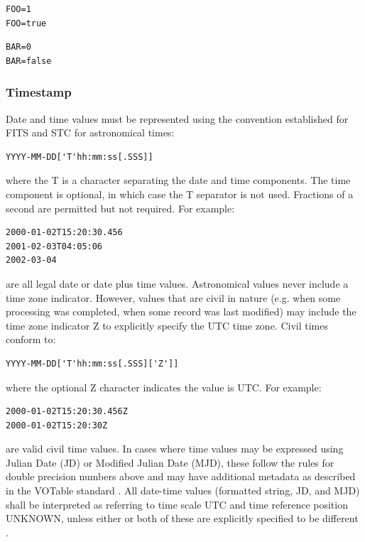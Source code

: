 \documentclass[11pt,letter]{ivoa}
\begin{document}
\begin{verbatim}
FOO=1
FOO=true
\end{verbatim}

\begin{verbatim}
BAR=0
BAR=false
\end{verbatim}

\subsubsection{Timestamp}
Date and time values must be represented  using the convention established for 
FITS \citep{std:FITS} and STC \citep{std:STC} for astronomical times:

\begin{verbatim}
YYYY-MM-DD['T'hh:mm:ss[.SSS]]
\end{verbatim}

where the  T is a character separating the date and time components. The time 
component is optional, in which case the T separator is not used. Fractions of a 
second are permitted but not required. For example:

\begin{verbatim}
2000-01-02T15:20:30.456
2001-02-03T04:05:06
2002-03-04
\end{verbatim}

are all legal date or date plus time values. Astronomical values never 
include a time zone indicator. However, values that 
are civil in nature (e.g. when some processing was completed, when some record 
was last modified) may include the time zone indicator Z to explicitly specify 
the UTC time zone. Civil times conform to:

\begin{verbatim}
YYYY-MM-DD['T'hh:mm:ss[.SSS]['Z']]
\end{verbatim}

where the optional Z character indicates the value is UTC. For example:

\begin{verbatim}
2000-01-02T15:20:30.456Z
2000-01-02T15:20:30Z
\end{verbatim}

are valid civil time values. In cases where time values may be 
expressed using Julian Date (JD) or Modified Julian Date (MJD), these follow the 
rules for double precision numbers above and may have additional metadata as 
described in the VOTable standard \citep{std:VOTABLE}. All date-time values (formatted string, JD, 
and MJD) shall be interpreted as referring to time scale UTC and time reference 
position UNKNOWN, unless either or both of these are explicitly specified to be 
different \citep{std:STC}. 
\end{document}
